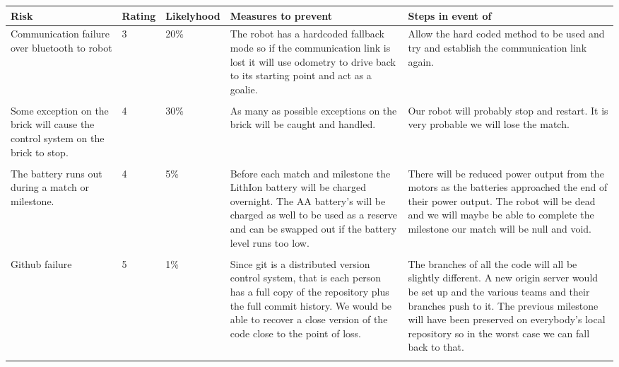 \documentclass{article}
\begin{document}
\begin{landscape}

    \begin{tabular}{ p{4cm}  p{2cm} p{2cm} p{4cm} p{4cm} }
        Risk & Rating & Likelyhood & Measures to prevent & Steps in event of\\
        \hline

        Communication failure over bluetooth to robot &
        3 &
        20\% &
        The robot
        has a hardcoded fallback mode so if the communication link is lost it
        will use odometry to drive back to its starting point and act as
        a goalie. &
        Allow the hard coded method to be used and try and establish the
        communication link again.\\
        \\
        Some exception on the brick will cause the control system on the brick
        to stop. &
        4 &
        30\% &
        As many as possible exceptions on the brick will be caught and handled.
        &
        Our robot will probably stop and restart. It is very probable we will
        lose the match.\\
        \\
        The battery runs out during a match or milestone. &
        4 &
        5\% &
        Before each match and milestone the LithIon battery will be charged
        overnight. The AA battery's will be charged as well to be used as
        a reserve and can be swapped out if the battery level runs too low.&
        There will be reduced power output from the motors as the batteries
        approached the end of their power output. The robot will be dead and we
        will maybe be able to complete the milestone our match will be null and
        void.\\
        \\
        Github failure &
        5 &
        1\% &
        Since git is a distributed version control system, that is each person
        has a full copy of the repository plus the full commit history. We
        would be able to recover a close version of the code close to the point
        of loss. &
        The branches of all the code will all be slightly different. A new
        origin server would be set up and the various teams and their branches
        push to it. The previous milestone will have been preserved on
        everybody's local repository so in the worst case we can fall back to
        that.\\
        \\

\end{tabular}
\end{landscape}
\end{document}
